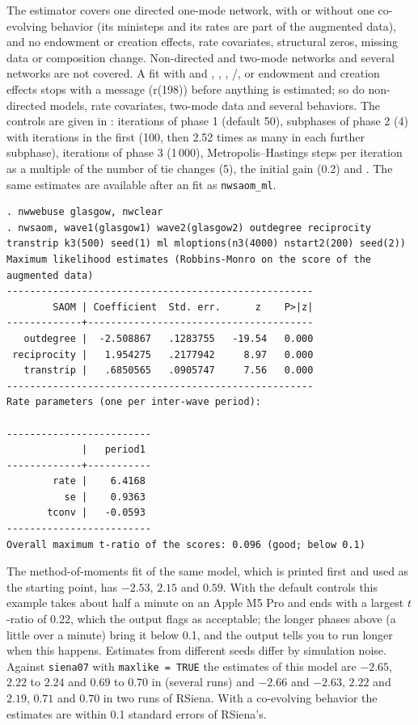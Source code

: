 The estimator covers one directed one-mode network, with or without one co-evolving behavior (its ministeps and its rates are part of the augmented data), and no endowment or creation effects, rate covariates, structural zeros, missing data or composition change. Non-directed and two-mode networks and several networks are not covered. A fit with  and , , , /,  or endowment and creation effects stops with a message (r(198)) before anything is estimated; so do non-directed models, rate covariates, two-mode data and several behaviors. The controls are given in :  iterations of phase 1 (default 50),  subphases of phase 2 (4) with  iterations in the first (100, then 2.52 times as many in each further subphase),  iterations of phase 3 (1\,000),  Metropolis--Hastings steps per iteration as a multiple of the number of tie changes (5),  the initial gain (0.2) and . The same estimates are available after an \nwsaom{} fit as \texttt{nwsaom\_ml}.
\begin{lstlisting}
. nwwebuse glasgow, nwclear
. nwsaom, wave1(glasgow1) wave2(glasgow2) outdegree reciprocity transtrip k3(500) seed(1) ml mloptions(n3(4000) nstart2(200) seed(2))
Maximum likelihood estimates (Robbins-Monro on the score of the augmented data)
-----------------------------------------------------
        SAOM | Coefficient  Std. err.      z    P>|z|
-------------+---------------------------------------
   outdegree |  -2.508867   .1283755   -19.54   0.000
 reciprocity |   1.954275   .2177942     8.97   0.000
   transtrip |   .6850565   .0905747     7.56   0.000
-----------------------------------------------------
Rate parameters (one per inter-wave period):

-------------------------
             |   period1
-------------+-----------
        rate |    6.4168
          se |    0.9363
       tconv |   -0.0593
-------------------------
Overall maximum t-ratio of the scores: 0.096 (good; below 0.1)
\end{lstlisting}
The method-of-moments fit of the same model, which is printed first and used as the starting point, has $-2.53$, $2.15$ and $0.59$. With the default controls this example takes about half a minute on an Apple M5 Pro and ends with a largest $t$-ratio of 0.22, which the output flags as acceptable; the longer phases above (a little over a minute) bring it below 0.1, and the output tells you to run longer when this happens. Estimates from different seeds differ by simulation noise. Against \texttt{siena07} with \texttt{maxlike = TRUE} the estimates of this model are $-2.65$, $2.22$ to $2.24$ and $0.69$ to $0.70$ in \nwsaom{} (several runs) and $-2.66$ and $-2.63$, $2.22$ and $2.19$, $0.71$ and $0.70$ in two runs of RSiena. With a co-evolving behavior the estimates are within 0.1 standard errors of RSiena's.

